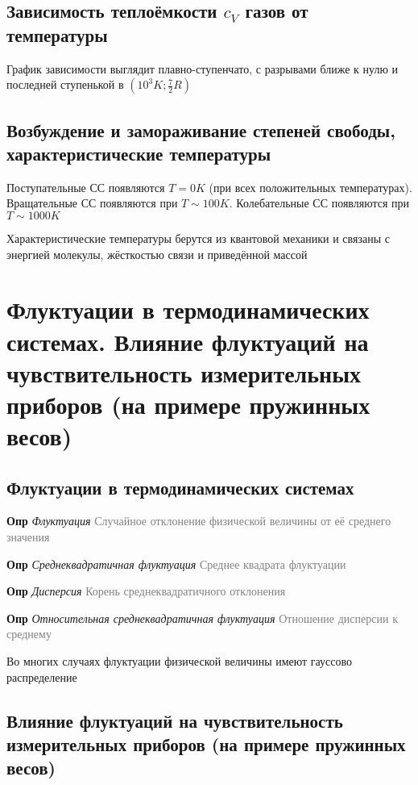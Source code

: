 \documentclass[a4paper, 14pt]{article}
\begin{document}
    \subsection{Зависимость теплоёмкости $c_V$ газов от температуры}

    График зависимости выглядит плавно-ступенчато, с разрывами ближе к нулю и последней ступенькой в $(10^3 K; \frac{7
    }{2}R)$

    \subsection{Возбуждение и замораживание степеней свободы, характеристические температуры}

    Поступательные СС появляются $T = 0 K$ (при всех положительных температурах).
    Вращательные СС появляются при $T \sim 100 K$.
    Колебательные СС появляются при $T \sim 1000 K$

    Характеристические температуры берутся из квантовой механики и связаны с энергией молекулы, жёсткостью связи и
    приведённой массой

    \section{Флуктуации в термодинамических системах.
    Влияние флуктуаций на чувствительность измерительных приборов (на примере пружинных весов)}

    \subsection{Флуктуации в термодинамических системах}

    \textbf{Опр} \textit{Флуктуация} \textcolor{gray}{Случайное отклонение физической величины от её среднего значения}

    \textbf{Опр} \textit{Среднеквадратичная флуктуация} \textcolor{gray}{Среднее квадрата флуктуации}

    \textbf{Опр} \textit{Дисперсия} \textcolor{gray}{Корень среднеквадратичного отклонения}

    \textbf{Опр} \textit{Относительная среднеквадратичная флуктуация} \textcolor{gray}{Отношение дисперсии к среднему}

    Во многих случаях флуктуации физической величины имеют гауссово распределение

    \subsection{Влияние флуктуаций на чувствительность измерительных приборов (на примере пружинных весов)}
\end{document}
